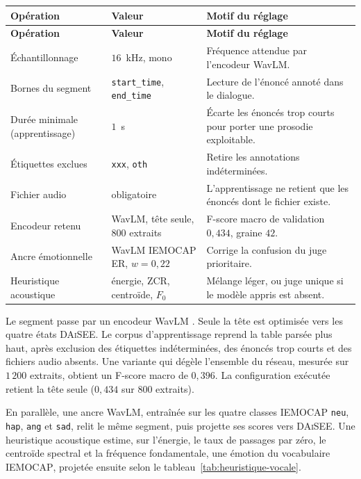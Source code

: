 {\small
\renewcommand{\arraystretch}{1.18}
\setlength{\tabcolsep}{4pt}
\begin{xltabular}{\textwidth}{|>{\raggedright\arraybackslash}X|>{\raggedright\arraybackslash}X|>{\raggedright\arraybackslash}X|}
\hline
{}
\textbf{Opération} & \textbf{Valeur} & \textbf{Motif du réglage} \\
\hline
\endfirsthead
\hline
{}
\textbf{Opération} & \textbf{Valeur} & \textbf{Motif du réglage} \\
\hline
\endhead
\endfoot
\endlastfoot
Échantillonnage & $16$~kHz, mono &
Fréquence attendue par l'encodeur WavLM. \\
\hline
Bornes du segment & \texttt{start\_time}, \texttt{end\_time} &
Lecture de l'énoncé annoté dans le dialogue. \\
\hline
Durée minimale (apprentissage) & $1$~s &
Écarte les énoncés trop courts pour porter une prosodie exploitable. \\
\hline
Étiquettes exclues & \texttt{xxx}, \texttt{oth} &
Retire les annotations indéterminées. \\
\hline
Fichier audio & obligatoire &
L'apprentissage ne retient que les énoncés dont le fichier existe. \\
\hline
Encodeur retenu & WavLM, tête seule, $800$ extraits &
F-score macro de validation $0{,}434$, graine $42$. \\
\hline
Ancre émotionnelle & WavLM \textsc{IEMOCAP} ER, $w=0{,}22$ &
Corrige la confusion du juge prioritaire. \\
\hline
Heuristique acoustique & énergie, ZCR, centroïde, $F_0$ &
Mélange léger, ou juge unique si le modèle appris est absent. \\
\hline
\end{xltabular}
\label{tab:params-ser}
}

Le segment passe par un encodeur WavLM \cite{chen2022wavlm}. Seule
la tête est optimisée vers les quatre états \textsc{DAiSEE}. Le
corpus d'apprentissage reprend la table parsée plus haut, après
exclusion des étiquettes indéterminées, des énoncés trop courts et
des fichiers audio absents. Une variante qui dégèle l'ensemble du
réseau, mesurée sur $1\,200$ extraits, obtient un F-score macro de
$0{,}396$. La configuration exécutée retient la tête seule
($0{,}434$ sur $800$ extraits).

En parallèle, une ancre WavLM, entraînée sur les quatre classes
\textsc{IEMOCAP} \texttt{neu}, \texttt{hap}, \texttt{ang} et
\texttt{sad}, relit le même segment, puis projette ses scores vers
\textsc{DAiSEE}. Une heuristique acoustique estime, sur l'énergie, le
taux de passages par zéro, le centroïde spectral et la fréquence
fondamentale, une émotion du vocabulaire \textsc{IEMOCAP}, projetée
ensuite selon le tableau~\ref{tab:heuristique-vocale}.

